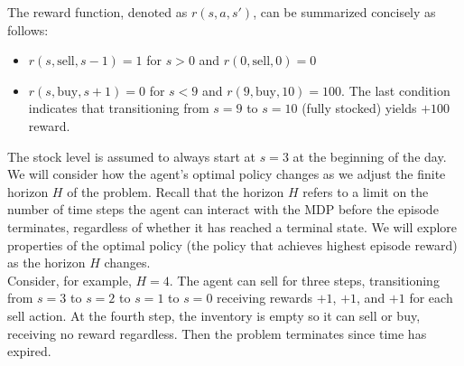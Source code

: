\documentclass[11pt]{article}
\begin{document}
The reward function, denoted as $r(s, a, s')$, can be summarized concisely as follows:
\begin{itemize}
    \item $r(s,\text{sell}, s-1) = 1$ for $s > 0$ and $r(0,\text{sell},0) = 0$
    \item $r(s, \text{buy}, s+1) = 0$ for $s < 9$ and $r(9, \text{buy}, 10) = 100$. The last condition indicates that transitioning from $s = 9$ to $s = 10$ (fully stocked) yields $+100$ reward.
\end{itemize}

\noindent The stock level is assumed to always start at $s = 3$ at the beginning of the day. We will consider how the agent's optimal policy changes as we adjust the finite horizon $H$ of the problem. Recall that the horizon $H$ refers to a limit on the number of time steps the agent can interact with the MDP before the episode terminates, regardless of whether it has reached a terminal state. We will explore properties of the optimal policy (the policy that achieves highest episode reward) as the horizon $H$ changes.\\

\noindent Consider, for example, $H = 4$. The agent can sell for three steps, transitioning from $s = 3$ to $s = 2$ to $s = 1$ to $s = 0$ receiving rewards $+1$, $+1$, and $+1$ for each sell action. At the fourth step, the inventory is empty so it can sell or buy, receiving no reward regardless. Then the problem terminates since time has expired.
\end{document}
